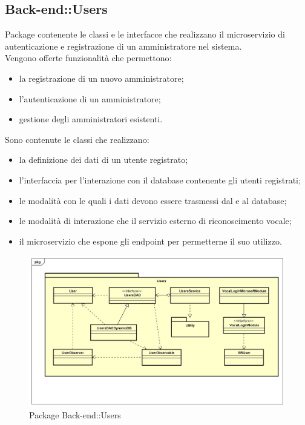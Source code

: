 \subsection{Back-end::Users}
Package contenente le classi e le interfacce che realizzano il microservizio di autenticazione e registrazione di un amministratore nel sistema.\\ Vengono offerte funzionalità che permettono: \begin{itemize} \item la registrazione di un nuovo amministratore; \item l'autenticazione di un amministratore; \item gestione degli amministratori esistenti. \end{itemize} Sono contenute le classi che realizzano: \begin{itemize} \item la definizione dei dati di un utente registrato; \item l'interfaccia per l'interazione con il database contenente gli utenti registrati; \item le modalità con le quali i dati devono essere trasmessi dal e al database; \item le modalità di interazione che il servizio esterno di riconoscimento vocale; \item il microservizio che espone gli endpoint per permetterne il suo utilizzo. \end{itemize}
\begin{figure}[h] \centering \includegraphics[width=\textwidth,height=\textheight,keepaspectratio]{images/diagrams/back-end/Official_Backend_0304/Users.png}
	\caption{Package Back-end::Users}
\end{figure}
\newpage

